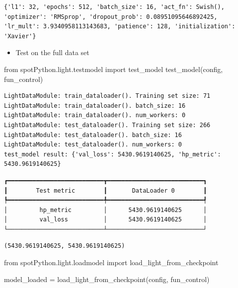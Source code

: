 \documentclass[
  letterpaper,
  DIV=11,
  numbers=noendperiod]{scrreprt}
\newenvironment{Shaded}{\begin{snugshade}}{\end{snugshade}}
\newcommand{\ImportTok}[1]{\textcolor[rgb]{0.00,0.46,0.62}{#1}}
\newcommand{\NormalTok}[1]{\textcolor[rgb]{0.00,0.23,0.31}{#1}}
\newcommand{\OperatorTok}[1]{\textcolor[rgb]{0.37,0.37,0.37}{#1}}
\providecommand{\tightlist}{%
  \setlength{\itemsep}{0pt}\setlength{\parskip}{0pt}}\usepackage{longtable,booktabs,array}
\begin{document}
\begin{verbatim}
{'l1': 32, 'epochs': 512, 'batch_size': 16, 'act_fn': Swish(), 'optimizer': 'RMSprop', 'dropout_prob': 0.08951095646892425, 'lr_mult': 3.9340958113143683, 'patience': 128, 'initialization': 'Xavier'}
\end{verbatim}

\begin{itemize}
\tightlist
\item
  Test on the full data set
\end{itemize}

\begin{Shaded}
\begin{Highlighting}[]
\ImportTok{from}\NormalTok{ spotPython.light.testmodel }\ImportTok{import}\NormalTok{ test\_model}
\NormalTok{test\_model(config, fun\_control)}
\end{Highlighting}
\end{Shaded}

\begin{verbatim}
LightDataModule: train_dataloader(). Training set size: 71
LightDataModule: train_dataloader(). batch_size: 16
LightDataModule: train_dataloader(). num_workers: 0
LightDataModule: test_dataloader(). Training set size: 266
LightDataModule: test_dataloader(). batch_size: 16
LightDataModule: test_dataloader(). num_workers: 0
test_model result: {'val_loss': 5430.9619140625, 'hp_metric': 5430.9619140625}
\end{verbatim}

\begin{verbatim}
┏━━━━━━━━━━━━━━━━━━━━━━━━━━━┳━━━━━━━━━━━━━━━━━━━━━━━━━━━┓
┃        Test metric        ┃       DataLoader 0        ┃
┡━━━━━━━━━━━━━━━━━━━━━━━━━━━╇━━━━━━━━━━━━━━━━━━━━━━━━━━━┩
│         hp_metric         │      5430.9619140625      │
│         val_loss          │      5430.9619140625      │
└───────────────────────────┴───────────────────────────┘
\end{verbatim}

\begin{verbatim}
(5430.9619140625, 5430.9619140625)
\end{verbatim}

\begin{Shaded}
\begin{Highlighting}[]
\ImportTok{from}\NormalTok{ spotPython.light.loadmodel }\ImportTok{import}\NormalTok{ load\_light\_from\_checkpoint}

\NormalTok{model\_loaded }\OperatorTok{=}\NormalTok{ load\_light\_from\_checkpoint(config, fun\_control)}
\end{Highlighting}
\end{Shaded}
\end{document}
